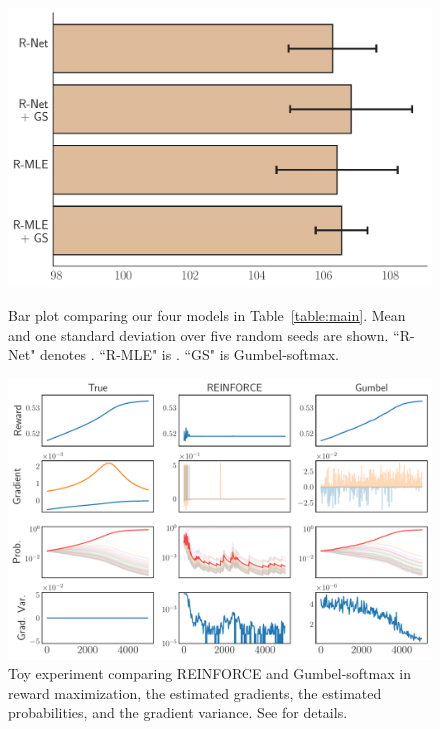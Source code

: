 \begin{figure}[tb]
\vspace{-2mm}
    \centering
    \begin{minipage}{0.49\textwidth}
        \centering
        \includegraphics[width=1\linewidth]{./Tex/fig/w_wo_gs_bar.pdf}
        \captionsetup{font=small}
        \vspace{-2em}
        \caption{\footnotesize{ Bar plot comparing our four models in Table~\ref{table:main}.
        Mean and one standard deviation over five random seeds are shown.
        ``R-Net" denotes \rewardnet. ``R-MLE" is \rewardmle. ``GS" is Gumbel-softmax.
        }}
        \label{fig:abla_gs}
    \end{minipage}
    \hfill
    \begin{minipage}{0.49\textwidth}
        \centering
        \includegraphics[width=1\linewidth]{./Tex/fig/gs_gradient_var_plot.pdf} %
        \captionsetup{font=small}
        \vspace{-2em}
        \caption{\footnotesize{Toy experiment comparing REINFORCE and Gumbel-softmax in reward maximization, the estimated gradients, the estimated probabilities, and the gradient variance.
        See  for details.}}
        \label{fig:abla_toy}
    \end{minipage}
    \vspace{-.8em}
\end{figure}




